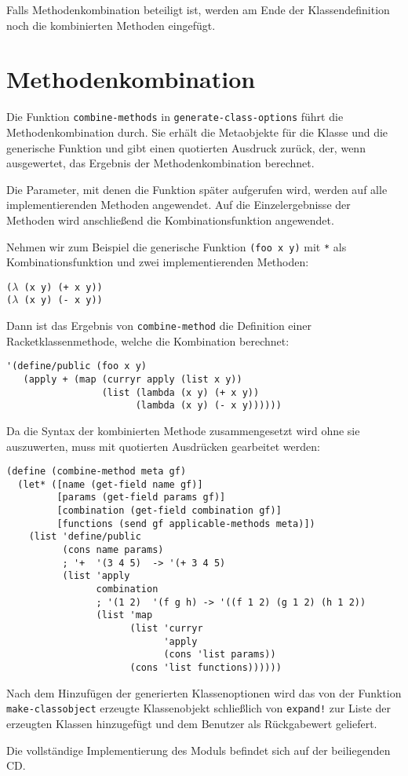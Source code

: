 Falls Methodenkombination beteiligt ist, werden am Ende der Klassendefinition noch die kombinierten Methoden eingefügt.

\section{Methodenkombination}
\label{combination-impl}
Die Funktion \texttt{combine-methods} in \texttt{generate-class-options} führt die Methodenkombination durch. Sie erhält die Metaobjekte für die Klasse und die generische Funktion und gibt einen quotierten Ausdruck zurück, der, wenn ausgewertet, das Ergebnis der Methodenkombination berechnet.

Die Parameter, mit denen die Funktion später aufgerufen wird, werden auf alle implementierenden Methoden angewendet. Auf die Einzelergebnisse der Methoden wird anschließend die Kombinationsfunktion angewendet.

Nehmen wir zum Beispiel die generische Funktion \texttt{(foo x y)} mit \texttt{*} als Kombinationsfunktion und zwei implementierenden Methoden:

\texttt{($\lambda$ (x y) (+ x y))\\
($\lambda$ (x y) (- x y))}

Dann ist das Ergebnis von \texttt{combine-method} die Definition einer Racketklassenmethode, welche die Kombination berechnet:

\begin{lstlisting}
'(define/public (foo x y)
   (apply + (map (curryr apply (list x y))
                 (list (lambda (x y) (+ x y))
                       (lambda (x y) (- x y))))))
\end{lstlisting}

Da die Syntax der kombinierten Methode zusammengesetzt wird ohne sie auszuwerten, muss mit quotierten Ausdrücken gearbeitet werden:

\begin{lstlisting}
(define (combine-method meta gf)
  (let* ([name (get-field name gf)]
         [params (get-field params gf)]
         [combination (get-field combination gf)]
         [functions (send gf applicable-methods meta)])
    (list 'define/public
          (cons name params)
          ; '+  '(3 4 5)  -> '(+ 3 4 5)
          (list 'apply
                combination
                ; '(1 2)  '(f g h) -> '((f 1 2) (g 1 2) (h 1 2))
                (list 'map
                      (list 'curryr
                            'apply
                            (cons 'list params))
                      (cons 'list functions))))))
\end{lstlisting}

Nach dem Hinzufügen der generierten Klassenoptionen wird das von der Funktion \texttt{make-classobject} erzeugte Klassenobjekt schließlich von \texttt{expand!} zur Liste der erzeugten Klassen hinzugefügt und dem Benutzer als Rückgabewert geliefert. 

Die vollständige Implementierung des Moduls befindet sich auf der beiliegenden CD.